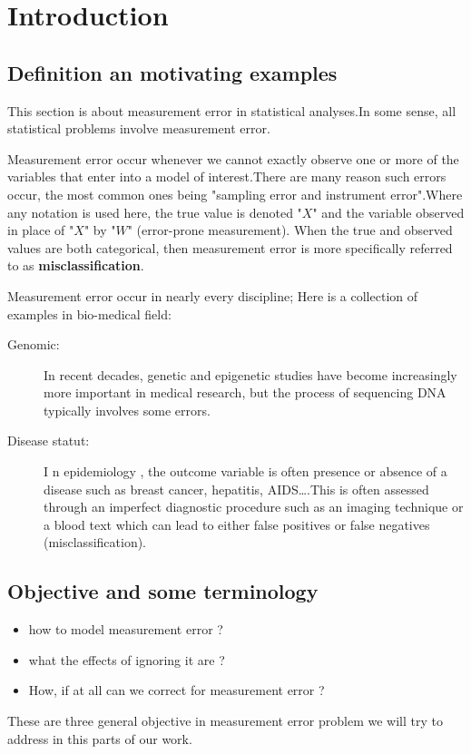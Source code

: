 \documentclass[12pt]{report}
\begin{document}
	\section{Introduction}
	\subsection{Definition an motivating examples}
	This section is about measurement error in statistical analyses.In some sense, all statistical problems involve measurement error.
	
	Measurement error occur whenever we cannot exactly observe one or more of the variables that enter into a model of interest.There are many reason such errors occur, the most common ones being "sampling error and instrument error".Where any notation is used here, the true value is denoted "$X$" and the variable observed in place of "$X$" by "$W$" (error-prone measurement). When the true and observed values are both categorical, then measurement error is more specifically referred to as \textbf{misclassification}.
	
	Measurement error occur in nearly every discipline; Here is a collection of examples in bio-medical field:
	\begin{description}
		\item[Genomic:] In recent decades, genetic and epigenetic studies have become increasingly more important in medical research, but the process of sequencing DNA typically involves some errors.
		\item[Disease statut:] I n epidemiology , the outcome variable is often presence or absence of a disease such as breast cancer, hepatitis, AIDS\dots .This is often assessed through an imperfect diagnostic procedure such as an imaging technique or a blood text which can lead to either false positives or false negatives (misclassification).
	\end{description}
\subsection{Objective and some terminology}
\label{spc}

\begin{itemize}
	\item how to model measurement error ?
	\item what the effects of ignoring it are ?
	\item How, if at all can we correct for measurement error ?
\end{itemize}
These are three general objective in measurement error problem we will try to address in this parts of our work.
\end{document}
